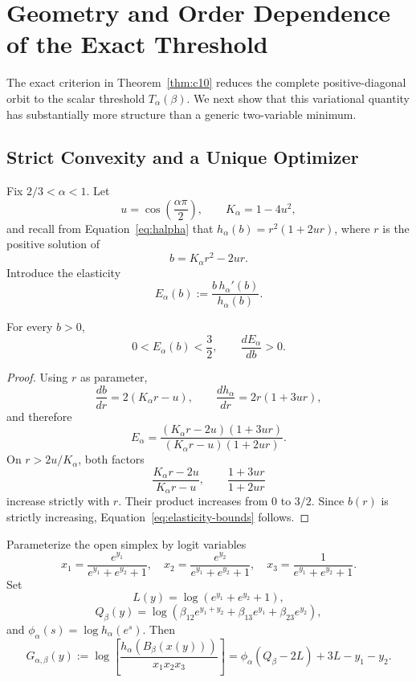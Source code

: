 \section{Geometry and Order Dependence of the Exact Threshold}\label{sec:geometry}

The exact criterion in Theorem~\ref{thm:c10} reduces the complete positive-diagonal orbit to the scalar threshold \(T_\alpha(\beta)\). We next show that this variational quantity has substantially more structure than a generic two-variable minimum.

\subsection{Strict Convexity and a Unique Optimizer}

Fix \(2/3<\alpha<1\). Let
\[
 u=\cos\!\left(\frac{\alpha\pi}{2}\right),\qquad
 K_\alpha=1-4u^2,
\]
and recall from Equation~\eqref{eq:halpha} that \(h_\alpha(b)=r^2(1+2ur)\), where \(r\) is the positive solution of
\[
 b=K_\alpha r^2-2ur.
\]
Introduce the elasticity
\begin{equation}
 E_\alpha(b)
 :=
 \frac{b\,h_\alpha'(b)}{h_\alpha(b)}.
 \label{eq:elasticity}
\end{equation}

\begin{Lemma}\label{lem:elasticity}
For every \(b>0\),
\begin{equation}
 0<E_\alpha(b)<\frac32,
 \qquad
 \frac{dE_\alpha}{db}>0.
 \label{eq:elasticity-bounds}
\end{equation}
\end{Lemma}

\begin{proof}
Using \(r\) as parameter,
\[
 \frac{db}{dr}=2(K_\alpha r-u),
 \qquad
 \frac{dh_\alpha}{dr}=2r(1+3ur),
\]
and therefore
\begin{equation}
 E_\alpha
 =
 \frac{(K_\alpha r-2u)(1+3ur)}
      {(K_\alpha r-u)(1+2ur)}.
 \label{eq:E-r}
\end{equation}
On \(r>2u/K_\alpha\), both factors
\[
 \frac{K_\alpha r-2u}{K_\alpha r-u},
 \qquad
 \frac{1+3ur}{1+2ur}
\]
increase strictly with \(r\). Their product increases from \(0\) to \(3/2\). Since \(b(r)\) is strictly increasing, Equation~\eqref{eq:elasticity-bounds} follows.
\end{proof}

Parameterize the open simplex by logit variables
\begin{equation}
 x_1=\frac{e^{y_1}}{e^{y_1}+e^{y_2}+1},
 \quad
 x_2=\frac{e^{y_2}}{e^{y_1}+e^{y_2}+1},
 \quad
 x_3=\frac{1}{e^{y_1}+e^{y_2}+1}.
 \label{eq:logit}
\end{equation}
Set
\[
 L(y)=\log(e^{y_1}+e^{y_2}+1),
\]
\[
 Q_\beta(y)
 =
 \log\!\left(
 \beta_{12}e^{y_1+y_2}
 +\beta_{13}e^{y_1}
 +\beta_{23}e^{y_2}
 \right),
\]
and \(\phi_\alpha(s)=\log h_\alpha(e^s)\). Then
\begin{equation}
 G_{\alpha,\beta}(y)
 :=
 \log\!\left[
 \frac{h_\alpha(B_\beta(x(y)))}{x_1x_2x_3}
 \right]
 =
 \phi_\alpha(Q_\beta-2L)+3L-y_1-y_2.
 \label{eq:logobjective}
\end{equation}

